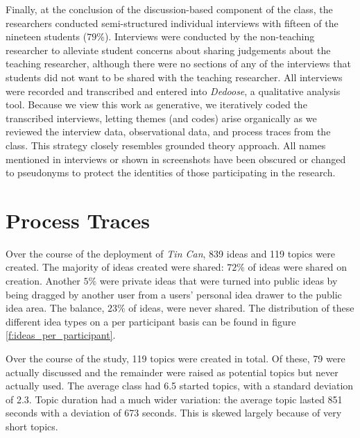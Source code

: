 Finally, at the conclusion of the discussion-based component of the class, the researchers conducted semi-structured individual interviews with fifteen of the nineteen students ($79$\%). Interviews were conducted by the non-teaching researcher to alleviate student concerns about sharing judgements about the teaching researcher, although there were no sections of any of the interviews that students did not want to be shared with the teaching researcher. All interviews were recorded and transcribed and entered into \emph{Dedoose}, a qualitative analysis tool. Because we view this work as generative, we iteratively coded the transcribed interviews, letting themes (and codes) arise organically as we reviewed the interview data, observational data, and process traces from the class. This strategy closely resembles  grounded theory approach. All names mentioned in interviews or shown in screenshots have been obscured or changed to pseudonyms to protect the identities of those participating in the research.



\section{Process Traces}

Over the course of the deployment of \emph{Tin Can}, 839 ideas and 119 topics were created. The  majority of ideas created were shared: $72\%$ of ideas were shared on creation. Another $5\%$ were private ideas that were turned into public ideas by being dragged by another user from a users' personal idea drawer to the public idea area. The balance, $23\%$ of ideas, were never shared. The distribution of these different idea types on a per participant basis can be found in figure \ref{f:ideas_per_participant}. 

Over the course of the study, 119 topics were created in total. Of these, 79 were actually discussed and the remainder were raised as potential topics but never actually used. The average class had 6.5 started topics, with a standard deviation of 2.3. Topic duration had a much wider variation: the average topic lasted 851 seconds with a deviation of 673 seconds. This is skewed largely because of very short topics. 


